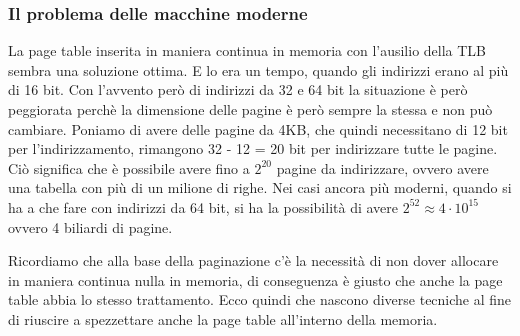 % 
\subsubsection*{Il problema delle macchine moderne}
La page table inserita in maniera continua in memoria con l'ausilio della TLB sembra una soluzione ottima. E lo era un tempo, quando gli indirizzi erano al più di 16 bit. Con l'avvento però di indirizzi da 32 e 64 bit la situazione è però peggiorata perchè la dimensione delle pagine è però sempre la stessa e non può cambiare. Poniamo di avere delle pagine da 4KB, che quindi necessitano di 12 bit per l'indirizzamento, rimangono 32 - 12 = 20 bit per indirizzare tutte le pagine. Ciò significa che è possibile avere fino a $2^{20}$ pagine da indirizzare, ovvero avere una tabella con più di un milione di righe. Nei casi ancora più moderni, quando si ha a che fare con indirizzi da 64 bit, si ha la possibilità di avere $2^{52} \approx 4\cdot10^{15}$ ovvero 4 biliardi di pagine. 

Ricordiamo che alla base della paginazione c'è la necessità di non dover allocare in maniera continua nulla in memoria, di conseguenza è giusto che anche la page table abbia lo stesso trattamento. Ecco quindi che nascono diverse tecniche al fine di riuscire a spezzettare anche la page table all'interno della memoria. 

% 
